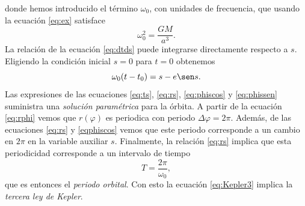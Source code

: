 donde hemos introducido el término $\omega_0$, con unidades de frecuencia, que usando la ecuación \ref{eq:ex} satisface 
\begin{equation}\label{Kepler3}
    \omega_0^2=\frac{GM}{a^3}.    
\end{equation}
La relación de la ecuación \ref{eq:dtds} puede integrarse directamente respecto a $s$. Eligiendo la condición inicial $s=0$ para $t=0$ obtenemos
\begin{equation}\label{eq:ts}
    \omega_0(t-t_0)=s-e\sen s.
\end{equation}
Las expresiones de las ecuaciones \ref{eq:ts}, \ref{eq:rs}, \ref{eq:phiscos} y \ref{eq:phissen} suministra una \textit{solución paramétrica} para la órbita.
A partir de la ecuación \ref{eq:rphi} vemos que $r(\varphi)$ es periodica con periodo $\Delta\varphi=2\pi$. Además, de las ecuaciones \ref{eq:rs} y \ref{eqphiscos} 
vemos que este periodo corresponde a un cambio en $2\pi$ en la variable auxiliar $s$. 
Finalmente, la relación \ref{eq:rs} implica que esta periodicidad corresponde a un intervalo de tiempo
\begin{equation}
T=\frac{2\pi}{\omega_0},
\end{equation}
que es entonces el \textit{periodo orbital}. Con esto la ecuación \ref{eq:Kepler3} implica la \textit{tercera ley de Kepler}.